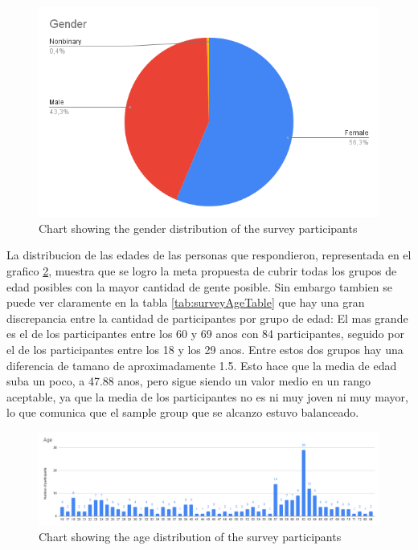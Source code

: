 \FloatBarrier
\begin{figure}[!htbp]
    \centering
    \includegraphics[width=15cm]{Images/General/03_user_centered_design/Survey/Gender.png}
    \caption{Chart showing the gender distribution of the survey participants}
    \label{fig:surveyGender}
\end{figure}
\FloatBarrier

La distribucion de las edades de las personas que respondieron, representada en el grafico \ref{fig:surveyAge}, muestra que se logro la meta propuesta de cubrir todas los grupos de edad posibles con la mayor cantidad de gente posible. Sin embargo tambien se puede ver claramente en la tabla \ref{tab:surveyAgeTable} que hay una gran discrepancia entre la cantidad de participantes por grupo de edad: El mas grande es el de los participantes entre los 60 y 69 anos con 84 participantes, seguido por el de los participantes entre los 18 y los 29 anos. Entre estos dos grupos hay una diferencia de tamano de aproximadamente 1.5. Esto hace que la media de edad suba un poco, a 47.88 anos, pero sigue siendo un valor medio en un rango aceptable, ya que la media de los participantes no es ni muy joven ni muy mayor, lo que comunica que el sample group que se alcanzo estuvo balanceado.

\FloatBarrier
\begin{figure}[!htbp]
    \centering
    \includegraphics[width=15cm]{Images/General/03_user_centered_design/Survey/Age.png}
    \caption{Chart showing the age distribution of the survey participants}
    \label{fig:surveyAge}
\end{figure}
\FloatBarrier


